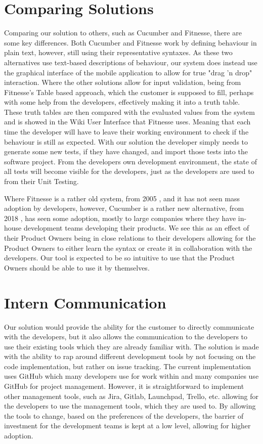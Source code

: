 \section{Comparing Solutions}
Comparing our solution to others, such as Cucumber and Fitnesse, there are some key differences.
Both Cucumber and Fitnesse work by defining behaviour in plain text, however, still using their representative syntaxes.
As these two alternatives use text-based descriptions of behaviour, our system does instead use the graphical interface of the mobile application to allow for true "drag 'n drop" interaction.
Where the other solutions allow for input validation, being from Fitnesse's Table based approach, which the customer is supposed to fill, perhaps with some help from the developers, effectively making it into a truth table.
These truth tables are then compared with the evaluated values from the system and is showed in the Wiki User Interface that Fitnesse uses.
Meaning that each time the developer will have to leave their working environment to check if the behaviour is still as expected.
With our solution the developer simply needs to generate some new tests, if they have changed, and import those tests into the software project.
From the developers own development environment, the state of all tests will become visible for the developers, just as the developers are used to from their Unit Testing.

Where Fitnesse is a rather old system, from 2005 \cite{FitnesseDownload}, and it has not seen mass adoption by developers, however, Cucumber is a rather new alternative, from 2018 \cite{CucumberWiki}, has seen some adoption, mostly to large companies where they have in-house development teams developing their products.
We see this as an effect of their Product Owners being in close relations to their developers allowing for the Product Owners to either learn the syntax or create it in collaboration with the developers.
Our tool is expected to be so intuitive to use that the Product Owners should be able to use it by themselves.

\section{Intern Communication}
Our solution would provide the ability for the customer to directly communicate with the developers, but it also allows the communication to the developers to use their existing tools which they are already familiar with.
The solution is made with the ability to rap around different development tools by not focusing on the code implementation, but rather on issue tracking.
The current implementation uses GitHub which many developers use for work within and many companies use GitHub for project management.
However, it is straightforward to implement other management tools, such as Jira, Gitlab, Launchpad, Trello, etc. allowing for the developers to use the management tools, which they are used to.
By allowing the tools to change, based on the preferences of the developers, the barrier of investment for the development teams is kept at a low level, allowing for higher adoption.

